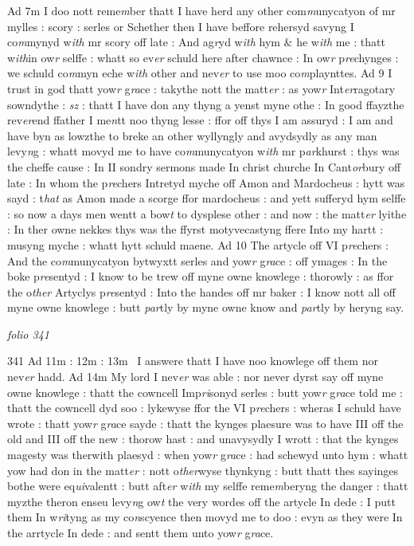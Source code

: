 \documentclass[12pt, a4paper]{book}
\begin{document}
Ad 7m  I doo nott reme\textit{m}ber thatt I have herd any other com\textit{m}unycatyon of mr mylles : scory : serles or Schether then I have beffore rehersyd savyng I co\textit{m}mynyd w\textit{ith} mr scory off late : And ag\textit{r}yd w\textit{ith} hym \& he w\textit{ith} me : thatt w\textit{ith}in ow\textit{r} selffe : whatt so ev\textit{er} schuld here after chawnce : In ow\textit{r} p\textit{re}chynges : we schuld co\textit{m}myn eche w\textit{ith} other and nev\textit{er} to use moo co\textit{m}playnttes.  Ad 9  I trust in god thatt yow\textit{r} g\textit{ra}ce : takythe nott the matt\textit{er} : as yow\textit{r} Int\textit{er}ragotary sowndythe : \textit{sz} : thatt I have don any thyng a yenst myne othe : In good ffayzthe rev\textit{er}end ffather I me\textit{n}tt noo thyng lesse : ffor off thys I am assuryd : I am and have byn as lowzthe to breke an other wyllyngly and avydsydly as any man levy\textit{n}g : whatt movyd me to have co\textit{m}munycatyon w\textit{ith} mr p\textit{ar}khurst : thys was the cheffe cause : In II sondry sermons made  In christ churche In Cant\textit{or}bury off late : In whom the p\textit{re}chers Intretyd myche off Amon and Mardocheus : hytt was sayd : t\textit{hat}  as Amon made a scorge ffor mardocheus : and yett sufferyd  hym selffe : so now a days men wentt a bow\textit{t} to dysplese other : and now : the matt\textit{er} lyithe : In ther owne nekkes thys was the ffyrst motyvecastyng ffere Into my hartt : musyng myche : whatt hytt schuld maene.  Ad 10  The artycle off VI p\textit{re}chers : And the co\textit{m}munycatyon bytwyxtt serles and yow\textit{r} g\textit{ra}ce : off ymages : In the boke p\textit{re}sentyd : I know to  be trew off myne owne knowlege : thorowly : as ffor the o\textit{ther} Artyclys p\textit{re}sentyd : Into the handes off mr baker : I know nott all off myne owne knowlege : butt \textit{par}tly by myne owne know and \textit{par}tly by heryng say.

\dotfill
					

\textit{folio 341}


{\color{Mahogany}341} Ad 11m : 12m : 13m   I answere thatt I have noo knowlege off them nor nev\textit{er} hadd.  Ad 14m  My lord I nev\textit{er} was able : nor never dyrst say off myne owne  knowlege : thatt the cowncell Imp\textit{ri}sonyd serles : butt yow\textit{r} g\textit{ra}ce told me : thatt the cowncell dyd soo : lykewyse ffor the VI p\textit{re}chers : wheras I schuld have wrote : thatt yow\textit{r} g\textit{ra}ce sayde : thatt the kynges plaesure was to have III off the  old and III off the new : thorow hast : and unavysydly I wrott : that the kynges magesty was therwith plaesyd : when yow\textit{r} g\textit{ra}ce : had schewyd unto hym : whatt yow had don in  the matt\textit{er} : nott o\textit{ther}wyse thynkyng : butt thatt thes sayinges  bothe were eq\textit{ui}valentt : butt aft\textit{er} w\textit{ith} my selffe reme\textit{m}beryng the danger : thatt myzthe theron enseu levy\textit{n}g ow\textit{t} the very wordes off the artycle In dede : I putt them In w\textit{ri}tyng as my co\textit{n}scyence then movyd me to doo : evyn as they were In the arrtycle In dede : and sentt them unto yow\textit{r} g\textit{ra}ce.
\end{document}
